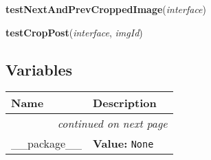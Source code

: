 \hspace{.8\funcindent}\begin{boxedminipage}{\funcwidth}

    \raggedright \textbf{testNextAndPrevCroppedImage}(\textit{interface})

\setlength{\parskip}{2ex}
\setlength{\parskip}{1ex}
    \end{boxedminipage}

    \label{client_rest:testCropPost}

    \vspace{0.5ex}

\hspace{.8\funcindent}\begin{boxedminipage}{\funcwidth}

    \raggedright \textbf{testCropPost}(\textit{interface}, \textit{imgId})

\setlength{\parskip}{2ex}
\setlength{\parskip}{1ex}
    \end{boxedminipage}



  \subsection{Variables}

    \vspace{-1cm}
\hspace{\varindent}\begin{longtable}{|p{\varnamewidth}|p{\vardescrwidth}|l}
\cline{1-2}
\cline{1-2} \centering \textbf{Name} & \centering \textbf{Description}& \\
\cline{1-2}
\endhead\cline{1-2}\multicolumn{3}{r}{\small\textit{continued on next page}}\\\endfoot\cline{1-2}
\endlastfoot\raggedright \_\-\_\-p\-a\-c\-k\-a\-g\-e\-\_\-\_\- & \raggedright \textbf{Value:} 
{\tt None}&\\
\cline{1-2}
\end{longtable}



